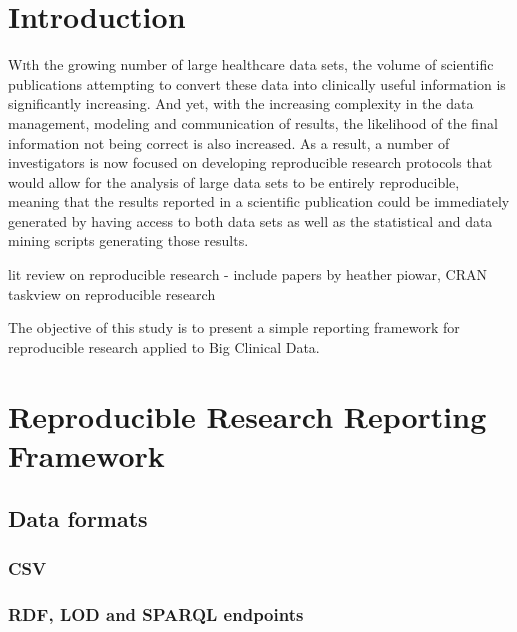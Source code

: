 \documentclass[twoside]{article}
\begin{document}
\begin{multicols}{2} %

\section{Introduction}

\lettrine[nindent=0em,lines=3]{W} ith the growing number of large healthcare data sets, the volume of scientific publications attempting to convert these data into clinically useful information is significantly increasing. And yet, with the increasing complexity in the data management, modeling and communication of results, the likelihood of the final information not being correct is also increased. As a result, a number of investigators is now focused on developing reproducible research protocols that would allow for the analysis of large data sets to be entirely reproducible, meaning that the results reported in a scientific publication could be immediately generated by having access to both data sets as well as the statistical and data mining scripts generating those results. 

\begin{compactitem}
\item lit review on reproducible research - include papers by heather piowar, CRAN taskview on reproducible research
\end{compactitem}

The objective of this study is to present a simple reporting framework for reproducible research applied to Big Clinical Data.



\section{Reproducible Research Reporting Framework}

\subsection{Data formats}

\subsubsection{CSV} 

\subsubsection{RDF, LOD and SPARQL endpoints}


\end{multicols}
\end{document}
